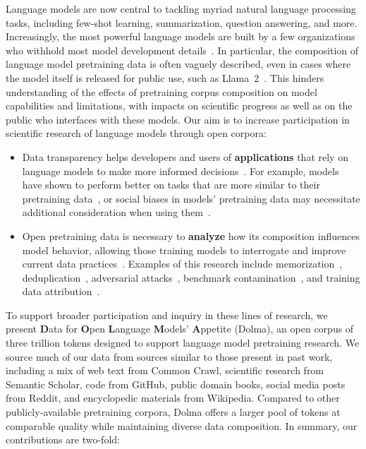 \documentclass{article}
\newcommand{\dolma}{Dolma\xspace}
\begin{document}
Language models are now central to tackling myriad natural language processing tasks, including few-shot learning, summarization, question answering, and more.
Increasingly, the most powerful language models are built by a few organizations who withhold most model development details~\citep{claude-announce,OpenAI2023GPT4TR,Anil2023PaLM2T,Gemini-Team2023-gn}. 
In particular, the composition of language model pretraining data is often vaguely described, even in cases where the model itself is released for public use, such as Llama~2~\citep{Touvron2023Llama2O}.  
This hinders understanding of the effects of pretraining corpus composition on model capabilities and limitations, with impacts on scientific progress as well as on the public who interfaces with these models. 
Our aim is to increase participation in scientific research of language models through open corpora:
\begin{itemize}[leftmargin=1em]
    \item  Data transparency helps developers and users of \textbf{applications} that rely on language models to make more informed decisions~\citep{gebru2021datasheets}.  
    For example, models have shown to perform better on tasks that are more similar to their pretraining data~\citep{razeghi-etal-2022-impact,pmlr-v202-kandpal23a},
    or social biases in models' pretraining data may necessitate additional consideration when using them~\citep{feng-etal-2023-pretraining,Navigli2023Biases,seshadri2023bias}.
    \item Open pretraining data is necessary to \textbf{analyze} 
    how its composition influences model behavior, allowing those training models to interrogate and improve current data practices~\citep{Longpre2023APG,Gao2021EmpircalEQ,wimbd}. 
    Examples of this research include memorization~\citep{Carlini2022-mj,Chang2023SpeakMA}, deduplication~\citep{lee-etal-2022-deduplicating}, adversarial attacks~\citep{wallace-etal-2021-concealed}, benchmark contamination~\citep{magar-schwartz-2022-data}, and training data attribution~\citep{Hammoudeh2022TrainingDI,Grosse2023StudyingLL}.
\end{itemize}

To support broader participation and inquiry in these lines of research, we present \textbf{D}ata for \textbf{O}pen \textbf{L}anguage \textbf{M}odels' \textbf{A}ppetite (\dolma), an open corpus of three trillion tokens designed to support language model pretraining research. 
We source much of our data from sources similar to those present in past work, including a mix of web text from Common Crawl, scientific research from Semantic Scholar, code from GitHub, public domain books, social media posts from Reddit, and encyclopedic materials from Wikipedia.
Compared to other publicly-available pretraining corpora, \dolma offers a larger pool of tokens at comparable quality while maintaining diverse data composition. 
In summary, our contributions are two-fold:
\end{document}
